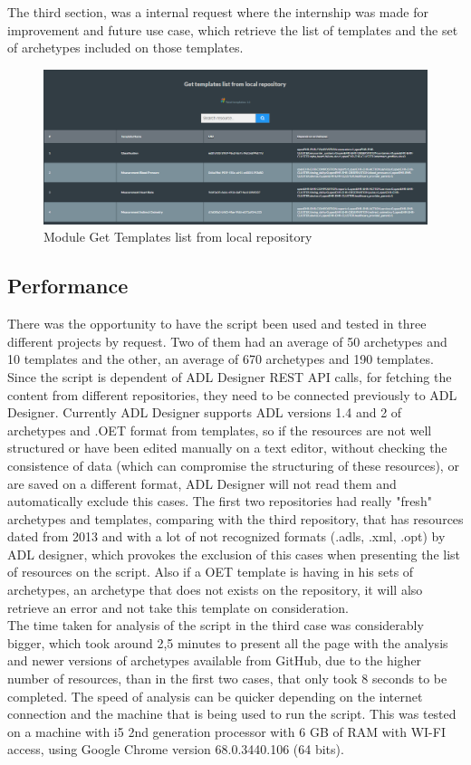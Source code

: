 \documentclass[mim_thesis.tex]{subfiles}
\begin{document}
The third section, was a internal request where the internship was made for improvement and future use case, which retrieve the list of templates and the set of archetypes included on those templates.

\begin{figure}[H]
	\centering
    \includegraphics[width=1\textwidth]{img/get_temp_list.PNG}
	\caption{Module Get Templates list from local repository }
	\label{fig:get_temp_list}
\end{figure}

\subsection{Performance}

There was the opportunity to have the script been used and tested in three different projects by request. Two of them had an average of 50 archetypes and 10 templates and the other, an average of 670 archetypes and 190 templates. Since the script is dependent of ADL Designer REST API calls, for fetching the content from different repositories, they need to be connected previously to ADL Designer. Currently ADL Designer supports ADL versions 1.4 and 2 of archetypes and .OET format from templates, so if the resources are not well structured or have been edited manually on a text editor, without checking the consistence of data (which can compromise the structuring of these resources), or are saved on a different format, ADL Designer will not read them and automatically exclude this cases. The first two repositories had really "fresh" archetypes and templates, comparing with the third repository, that has resources dated from 2013 and with a lot of not recognized formats (.adls, .xml, .opt) by ADL designer, which provokes the exclusion of this cases when presenting the list of resources on the script. Also if a OET template is having in his sets of archetypes, an archetype that does not exists on the repository, it will also retrieve an error and not take this template on consideration. \\

The time taken for analysis of the script in the third case was considerably bigger, which took around 2,5 minutes to present all the page with the analysis and newer versions of archetypes available from GitHub, due to the higher number of resources, than in the first two cases, that only took 8 seconds to be completed. The speed of analysis can be quicker depending on the internet connection and the machine that is being used to run the script. This was tested on a machine with i5 2nd generation processor with 6 GB of RAM with WI-FI access, using Google Chrome version 68.0.3440.106 (64 bits).
\end{document}
